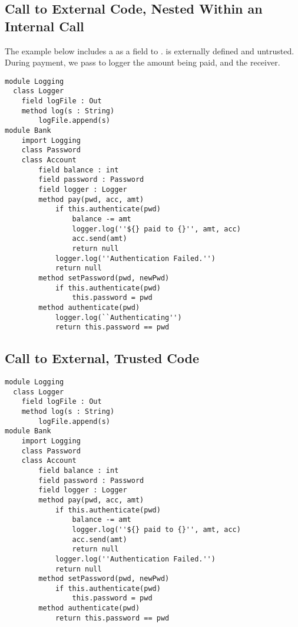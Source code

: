 \documentclass[11pt]{article} %
\theoremstyle{definition}
\begin{document}
\subsection{Call to External Code, Nested Within an Internal Call}
The example below includes a  as a field to . 
is externally defined and untrusted. During payment, we pass to logger the amount being paid, 
and the receiver.
\begin{lstlisting}[language = Chainmail, frame = lines]
module Logging
  class Logger
  	field logFile : Out
  	method log(s : String)
  		logFile.append(s)
module Bank
	import Logging
	class Password
	class Account
		field balance : int
		field password : Password
		field logger : Logger
		method pay(pwd, acc, amt)
			if this.authenticate(pwd)
				balance -= amt
				logger.log(''${} paid to {}'', amt, acc)
				acc.send(amt)
				return null
			logger.log(''Authentication Failed.'')
			return null
		method setPassword(pwd, newPwd)
			if this.authenticate(pwd)
				this.password = pwd
		method authenticate(pwd)
			logger.log(``Authenticating'')
			return this.password == pwd
\end{lstlisting}

\subsection{Call to External, Trusted Code}

\begin{lstlisting}[language = Chainmail, frame = lines]
module Logging
  class Logger
  	field logFile : Out
  	method log(s : String)
  		logFile.append(s)
module Bank
	import Logging
	class Password
	class Account
		field balance : int
		field password : Password
		field logger : Logger
		method pay(pwd, acc, amt)
			if this.authenticate(pwd)
				balance -= amt
				logger.log(''${} paid to {}'', amt, acc)
				acc.send(amt)
				return null
			logger.log(''Authentication Failed.'')
			return null
		method setPassword(pwd, newPwd)
			if this.authenticate(pwd)
				this.password = pwd
		method authenticate(pwd)
			return this.password == pwd
\end{lstlisting}
\end{document}

